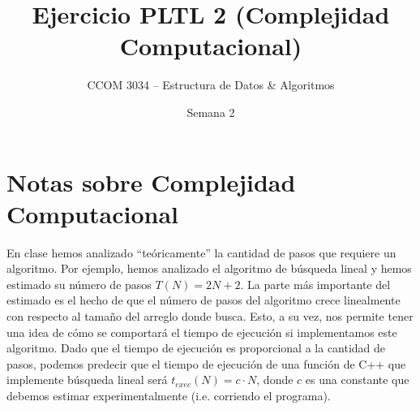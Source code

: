 \documentclass[11 pt]{article}
\title{Ejercicio PLTL 2 (Complejidad Computacional)}
\author{CCOM 3034 – Estructura de Datos \& Algoritmos}
\date{Semana 2}
\begin{document}
\maketitle

\section{Notas sobre Complejidad Computacional}

En clase hemos analizado ``te\'oricamente'' la cantidad de pasos que requiere un algoritmo. Por ejemplo, hemos analizado el algoritmo de b\'usqueda lineal y hemos estimado su n\'umero de pasos $T(N) = 2N + 2$. La parte m\'as importante del estimado es el hecho de que el n\'umero de pasos del algoritmo crece linealmente con respecto al tama\~no del arreglo donde busca. Esto, a su vez, nos permite tener una idea de c\'omo se comportar\'a el tiempo de ejecuci\'on si implementamos este algoritmo. Dado que el tiempo de ejecuci\'on es proporcional a la cantidad de pasos, podemos predecir que el tiempo de ejecuci\'on de una funci\'on de C++ que implemente b\'usqueda lineal ser\'a $t_{exec}(N) = c·N$, donde $c$ es una constante que debemos estimar experimentalmente (i.e. corriendo el programa).
\end{document}
